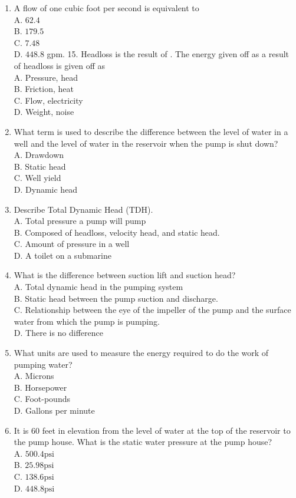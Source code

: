 \documentclass[10pt]{article}
\begin{document}
\begin{enumerate}
  \item A flow of one cubic foot per second is equivalent to\\
A. $62.4$\\
B. $179.5$\\
C. $7.48$\\
D. $448.8$ gpm. 15. Headloss is the result of . The energy given off as a result of headloss is given off as\\
A. Pressure, head\\
B. Friction, heat\\
C. Flow, electricity\\
D. Weight, noise

  \item What term is used to describe the difference between the level of water in a well and the level of water in the reservoir when the pump is shut down?\\
A. Drawdown\\
B. Static head\\
C. Well yield\\
D. Dynamic head

  \item Describe Total Dynamic Head (TDH).\\
A. Total pressure a pump will pump\\
B. Composed of headloss, velocity head, and static head.\\
C. Amount of pressure in a well\\
D. A toilet on a submarine

  \item What is the difference between suction lift and suction head?\\
A. Total dynamic head in the pumping system\\
B. Static head between the pump suction and discharge.\\
C. Relationship between the eye of the impeller of the pump and the surface water from which the pump is pumping.\\
D. There is no difference

  \item What units are used to measure the energy required to do the work of pumping water?\\
A. Microns\\
B. Horsepower\\
C. Foot-pounds\\
D. Gallons per minute

  \item It is 60 feet in elevation from the level of water at the top of the reservoir to the pump house. What is the static water pressure at the pump house?\\
A. $500.4 \mathrm{psi}$\\
B. $25.98 \mathrm{psi}$\\
C. $138.6 \mathrm{psi}$\\
D. $448.8 \mathrm{psi}$

\end{enumerate}
\end{document}
